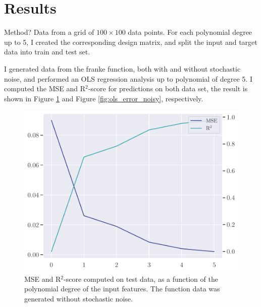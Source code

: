 \section{Results}\label{sec:results}
Method? Data from a grid of $100 \times 100$ data points. For each polynomial degree up to 5, I created the corresponding design matrix, and split the input and target data into train and test set.

I generated data from the franke function, both with and without stochastic noise, and performed an OLS regression analysis up to polynomial of degree 5. I computed the MSE and R$^{2}$-score for predictions on both data set, the result is shown in Figure \ref{fig:ols_error} and Figure \ref{fig:ols_error_noisy}, respectively.
\begin{figure}
    \centering
    \includegraphics[width=0.8\linewidth]{project-1/latex/figures/ols_error.pdf}
    \caption{MSE and R$^{2}$-score computed on test data, as a function of the polynomial degree of the input features. The function data was generated without stochastic noise.}
    \label{fig:ols_error}
\end{figure}

